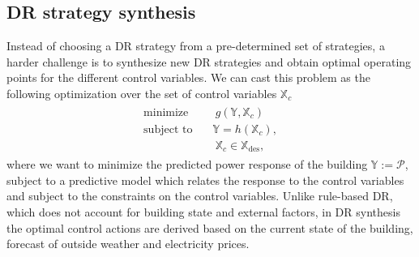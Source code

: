 \subsection{DR strategy synthesis}
\label{sec:synthesis}
Instead of choosing a DR strategy from a pre-determined set of strategies, a harder challenge is to synthesize new DR strategies and obtain optimal operating points for the different control variables.
We can cast this problem as the following optimization over the set of control variables $\mathbb{X}_c$
\begin{align}
\begin{aligned}
\text{minimize } \ \ \ & \ \mathit{g} \left( \mathbb{Y}, \mathbb{X}_c  \right) \\ 
\text{subject to } \ \ \ & \mathbb{Y} = h \left( \mathbb{X}_c \right), \\ 
\ \ \ & \ \mathbb{X}_c \in \mathbb{X}_{\mathrm{des}},
  \end{aligned}
  \label{eq:linear_program}
\end{align}
where we want to minimize the predicted power response of the building $\mathbb{Y}:=\mathcal{P}$, subject to a predictive model which relates the response to the control variables and subject to the constraints on the control variables.
Unlike rule-based DR, which does not account for building state and external factors, in DR synthesis the optimal control actions are derived based on the current state of the building, forecast of outside weather and electricity prices.